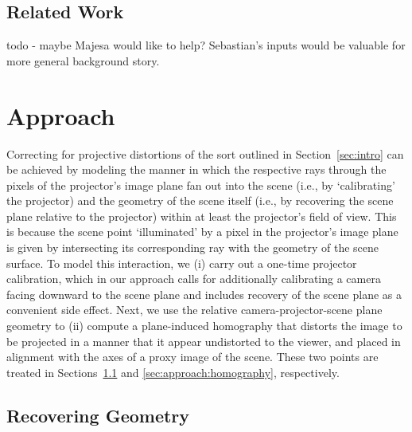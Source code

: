 \documentclass[review]{elsarticle}
\begin{document}
\subsection{Related Work}

todo - maybe Majesa would like to help? Sebastian's inputs would be valuable for more general background story.


\section{Approach}

Correcting for projective distortions of the sort outlined in Section~\ref{sec:intro} can be achieved by modeling the manner in which the respective rays through the pixels of the projector's image plane fan out into the scene (i.e., by `calibrating' the projector) and the geometry of the scene itself (i.e., by recovering the scene plane relative to the projector) within at least the projector's field of view. This is because the scene point `illuminated' by a pixel in the projector's image plane is given by intersecting its corresponding ray with the geometry of the scene surface. To model this interaction, we (i) carry out a one-time projector calibration, which in our approach calls for additionally calibrating a camera facing downward to the scene plane and includes recovery of the scene plane as a convenient side effect. Next, we use the relative camera-projector-scene plane geometry to (ii) compute a plane-induced homography that distorts the image to be projected in a manner that it appear undistorted to the viewer, and placed in alignment with the axes of a proxy image of the scene. These two points are treated in Sections~\ref{sec:approach:geometry} and \ref{sec:approach:homography}, respectively.

\subsection{Recovering Geometry}\label{sec:approach:geometry}
\end{document}
